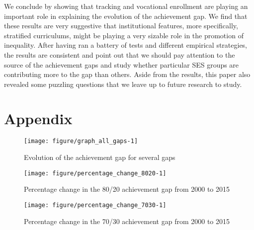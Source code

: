 \documentclass[11pt, a4paper]{article}\usepackage[]{graphicx}\usepackage[]{color}
\begin{document}
We conclude by showing that tracking and vocational enrollment are playing an important role in explaining the evolution of the achievement gap. We find that these results are very suggestive that institutional features, more specifically, stratified curriculums, might be playing a very sizable role in the promotion of inequality. After having ran a battery of tests and different empirical strategies, the results are consistent and point out that we should pay attention to the source of the achievement gaps and study whether particular SES groups are contributing more to the gap than others. Aside from the results, this paper also revealed some puzzling questions that we leave up to future research to study.



\pagebreak

\section{Appendix}

\begin{figure}[!htbp]

{\centering \texttt{[image: figure/graph\_all\_gaps-1]} 

}

\caption[Evolution of the achievement gap for several gaps]{Evolution of the achievement gap for several gaps}\label{fig:graph_all_gaps}
\end{figure}



\begin{figure}

{\centering \texttt{[image: figure/percentage\_change\_8020-1]} 

}

\caption[Percentage change in the 80/20 achievement gap from 2000 to 2015]{Percentage change in the 80/20 achievement gap from 2000 to 2015}\label{fig:percentage_change_8020}
\end{figure}



\begin{figure}

{\centering \texttt{[image: figure/percentage\_change\_7030-1]} 

}

\caption[Percentage change in the 70/30 achievement gap from 2000 to 2015]{Percentage change in the 70/30 achievement gap from 2000 to 2015}\label{fig:percentage_change_7030}
\end{figure}
\end{document}

